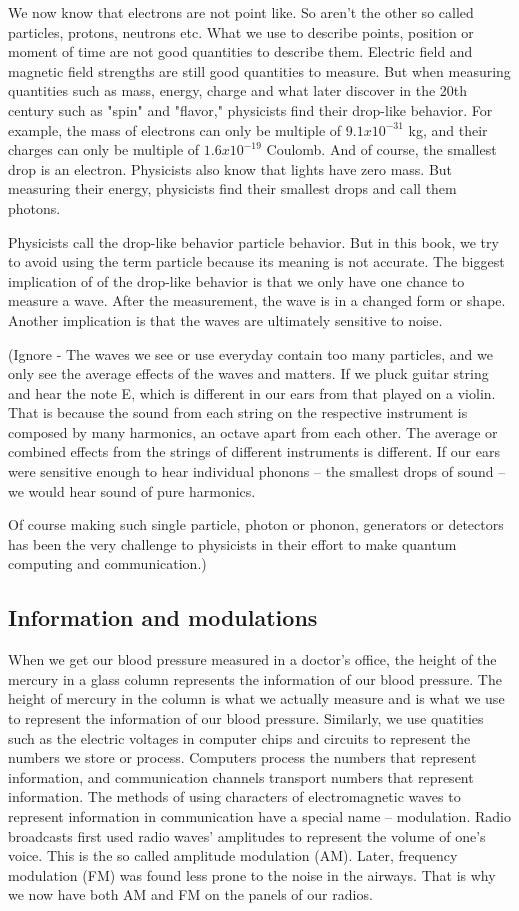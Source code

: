 \documentclass{book}
\begin{document}
We now know that electrons are not point like. So aren't the other so called particles, protons, neutrons etc. What we use to describe points, position or moment of time are not good quantities to describe them. Electric field and magnetic field strengths are still good quantities to measure. But when measuring quantities such as mass, energy, charge and what later discover in the 20th century such as "spin" and "flavor," physicists find their drop-like behavior. For example, the mass of electrons can only be multiple of $9.1x10^{-31}$ kg, and their charges can only be multiple of $1.6x10^{-19}$ Coulomb. And of course, the smallest drop is an electron. Physicists also know that lights have zero mass. But measuring their energy, physicists find their smallest drops and call them photons.

Physicists call the drop-like behavior particle behavior. But in this book, we try to avoid using the term particle because its meaning is not accurate. The biggest implication of of the drop-like behavior is that we only have one chance to measure a wave. After the measurement, the wave is in a changed form or shape. Another implication is that the waves are ultimately sensitive to noise.

(Ignore - The waves we see or use everyday contain too many particles, and we only see the average effects of the waves and matters. If we pluck guitar string and hear the note E, which is different in our ears from that played on a violin. That is because the sound from each string on the respective instrument is composed by many harmonics, an octave apart from each other. The average or combined effects from the strings of different instruments is different. If our ears were sensitive enough to hear individual phonons -- the smallest drops of sound -- we would hear sound of pure harmonics.

Of course making such single particle, photon or phonon, generators or detectors has been the very challenge to physicists in their effort to make quantum computing and communication.)

\subsection{Information and modulations}
When we get our blood pressure measured in a doctor's office, the height of the mercury in a glass column represents 
the information of our blood pressure. The height of mercury in the column is what we actually measure and is 
what we use to represent the information of our blood pressure. Similarly, we use quatities such as the electric 
voltages in computer chips and circuits to represent the numbers we store or process. Computers process the numbers that
represent information, and communication channels transport numbers that represent information. The methods of using characters
of electromagnetic waves to represent information in communication have a special name -- modulation. 
Radio broadcasts first used radio waves' amplitudes to represent the volume of one's voice. This is the so called amplitude modulation (AM). Later, frequency modulation (FM) was found less prone to the noise in the airways. That is why we now have both AM and FM on the panels of our radios.
\end{document}
